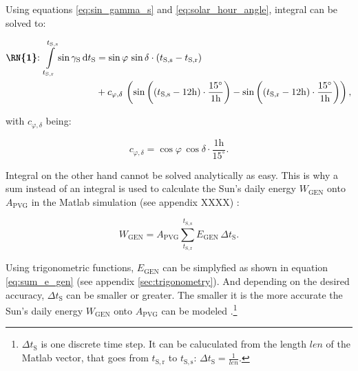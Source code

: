 Using equations \ref{eq:sin_gamma_s} and \ref{eq:solar_hour_angle}, integral  can be solved to:

\begin{center}
	\begin{equation} \label{eq:int_rn_1}
		\begin{aligned}
		\text{\textbf{\RN{1}}:} \ \int\limits_{t_{\mathrm{S,r}}}^{t_{\mathrm{S,s}}} \sin \gamma_{\mathrm{S}}\,\mathrm{d}t_\mathrm{S} &= 
		\sin \varphi \, \sin \delta \cdot \left(t_{\mathrm{S,s}} - t_{\mathrm{S,r}} \right) \\
		&+ c_{\varphi,\delta} \, \left(\sin \left(\left(t_{\mathrm{S,s}} - 12\mathrm{h} \right) \cdot \frac{15^\circ}{1\mathrm{h}} \right) - \sin \left(\left( t_{\mathrm{S,r}} - 12\mathrm{h} \right) \cdot \frac{15^\circ}{1\mathrm{h}} \right)\right) \text{,}
		\end{aligned}
	\end{equation}
\end{center}

with $c_{\varphi,\delta}$ being:

\begin{center}
	\begin{equation} \label{eq:const_varphi_delta}
		c_{\varphi,\delta} = \cos \varphi \, \cos \delta \cdot \frac{1\mathrm{h}}{15^\circ} \text{.}
	\end{equation}
\end{center}

Integral  on the other hand cannot be solved analytically as easy. This is why a sum instead of an integral is used to calculate the Sun's daily energy $W_{\mathrm{GEN}}$ onto $A_{\mathrm{PVG}}$ in the Matlab simulation (see appendix XXXX) \cite{Appelbaum:1992, Appelbaum:1993, Prechtl:2006, Prechtl:2008}:

\begin{center}
	\begin{equation} \label{eq:sum_energy}
		W_\mathrm{GEN} = A_{\mathrm{PVG}} \displaystyle\sum_{t_{\mathrm{S,r}}}^{t_{\mathrm{S,s}}} E_{\mathrm{GEN}} \, \Delta t_{\mathrm{S}} \text{.}
	\end{equation}
\end{center}

Using trigonometric functions, $E_{\mathrm{GEN}}$ can be simplyfied as shown in equation \ref{eq:sum_e_gen} (see appendix \ref{sec:trigonometry}). And depending on the desired accuracy, $\Delta t_{\mathrm{S}}$ can be smaller or greater. The smaller it is the more accurate the Sun's daily energy $W_{\mathrm{GEN}}$ onto $A_{\mathrm{PVG}}$ can be modeled \cite{Appelbaum:1992, Appelbaum:1993}.\footnote{$\Delta t_{\mathrm{S}}$ is one discrete time step. It can be caluculated from the length $len$ of the Matlab vector, that goes from $t_{\mathrm{S,r}}$ to $t_{\mathrm{S,s}}$: $\Delta t_{\mathrm{S}} = \frac{1}{len}$.}

